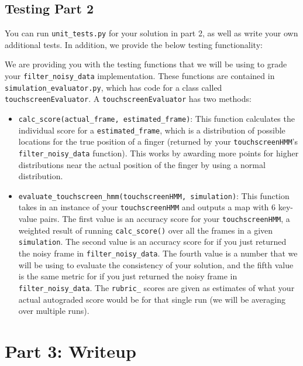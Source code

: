 \documentclass{article}
\begin{document}
\subsection{Testing Part 2}
\label{subsec:testingpart2}
You can run \texttt{unit\_tests.py} for your solution in part 2, as well as write your own additional tests. In addition, we provide the below testing functionality:

We are providing you with the testing functions that we will be using to grade your \texttt{filter\_noisy\_data} implementation. These functions are contained in \texttt{simulation\_evaluator.py}, which has code for a class called \texttt{touchscreenEvaluator}. A \texttt{touchscreenEvaluator} has two methods:
\begin{itemize}
    \item \texttt{calc\_score(actual\_frame, estimated\_frame)}:
    This function calculates the individual score for a \texttt{estimated\_frame}, which is a distribution of possible locations for the true position of a finger (returned by your \texttt{touchscreenHMM}'s \texttt{filter\_noisy\_data} function). This works by awarding more points for higher distributions near the actual position of the finger by using a normal distribution.
    \item \texttt{evaluate\_touchscreen\_hmm(touchscreenHMM, simulation)}:
    This function takes in an instance of your \texttt{touchscreenHMM} and outputs a map with 6 key-value pairs. The first value is an accuracy score for your \texttt{touchscreenHMM}, a weighted result of running \texttt{calc\_score()} over all the frames in a given \texttt{simulation}. The second value is an accuracy score for if you just returned the noisy frame in \texttt{filter\_noisy\_data}. The fourth value is a number that we will be using to evaluate the consistency of your solution, and the fifth value is the same metric for if you just returned the noisy frame in \texttt{filter\_noisy\_data}. The \texttt{rubric\_} scores are given as estimates of what your actual autograded score would be for that single run (we will be averaging over multiple runs).
\end{itemize}

\section{Part 3: Writeup}
\end{document}
